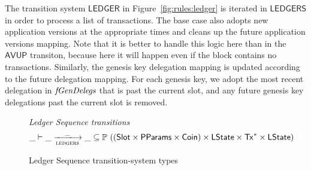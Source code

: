 \clearpage

The transition system $\mathsf{LEDGER}$ in Figure~\ref{fig:rules:ledger} is iterated
in $\mathsf{LEDGERS}$ in order to process a list of transactions.
The base case also adopts new application versions at the appropriate times
and cleans up the future application versions mapping.
Note that it is better to handle this logic here than in the $\mathsf{AVUP}$ transiton,
because here it will happen even if the block contains no transactions.
Similarly, the genesis key delegation mapping is updated according to the future delegation
mapping. For each genesis key, we adopt the most recent delegation in $\mathit{fGenDelegs}$
that is past the current slot, and any future genesis key delegations past the current
slot is removed.

\begin{figure}[htb]
  \emph{Ledger Sequence transitions}
  \begin{equation*}
    \_ \vdash
    \var{\_} \trans{ledgers}{\_} \var{\_}
    \subseteq \powerset ((\Slot\times\PParams\times\Coin) \times \LState \times \seqof{\Tx} \times \LState)
  \end{equation*}
  \caption{Ledger Sequence transition-system types}
  \label{fig:ts-types:ledgers}
\end{figure}

